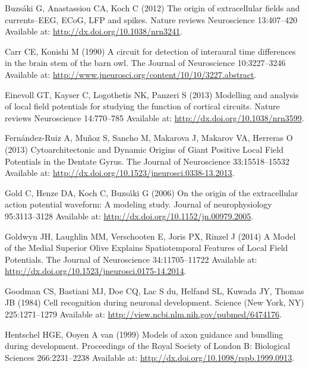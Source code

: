 \documentclass[]{article}
\begin{document}
Buzsáki G, Anastassiou CA, Koch C (2012) The origin of extracellular
fields and currents--EEG, ECoG, LFP and spikes. Nature reviews
Neuroscience 13:407--420 Available at:
\url{http://dx.doi.org/10.1038/nrn3241}.

Carr CE, Konishi M (1990) A circuit for detection of interaural time
differences in the brain stem of the barn owl. The Journal of
Neuroscience 10:3227--3246 Available at:
\url{http://www.jneurosci.org/content/10/10/3227.abstract}.

Einevoll GT, Kayser C, Logothetis NK, Panzeri S (2013) Modelling and
analysis of local field potentials for studying the function of cortical
circuits. Nature reviews Neuroscience 14:770--785 Available at:
\url{http://dx.doi.org/10.1038/nrn3599}.

Fernández-Ruiz A, Muñoz S, Sancho M, Makarova J, Makarov VA, Herreras O
(2013) Cytoarchitectonic and Dynamic Origins of Giant Positive Local
Field Potentials in the Dentate Gyrus. The Journal of Neuroscience
33:15518--15532 Available at:
\url{http://dx.doi.org/10.1523/jneurosci.0338-13.2013}.

Gold C, Henze DA, Koch C, Buzsáki G (2006) On the origin of the
extracellular action potential waveform: A modeling study. Journal of
neurophysiology 95:3113--3128 Available at:
\url{http://dx.doi.org/10.1152/jn.00979.2005}.

Goldwyn JH, Laughlin MM, Verschooten E, Joris PX, Rinzel J (2014) A
Model of the Medial Superior Olive Explains Spatiotemporal Features of
Local Field Potentials. The Journal of Neuroscience 34:11705--11722
Available at: \url{http://dx.doi.org/10.1523/jneurosci.0175-14.2014}.

Goodman CS, Bastiani MJ, Doe CQ, Lac S du, Helfand SL, Kuwada JY, Thomas
JB (1984) Cell recognition during neuronal development. Science (New
York, NY) 225:1271--1279 Available at:
\url{http://view.ncbi.nlm.nih.gov/pubmed/6474176}.

Hentschel HGE, Ooyen A van (1999) Models of axon guidance and bundling
during development. Proceedings of the Royal Society of London B:
Biological Sciences 266:2231--2238 Available at:
\url{http://dx.doi.org/10.1098/rspb.1999.0913}.
\end{document}
